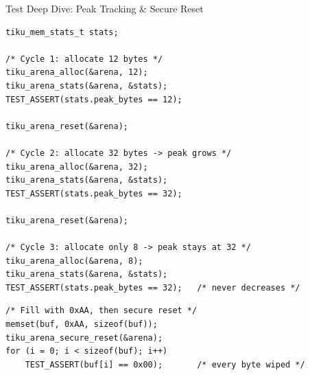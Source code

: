 \documentclass[aspectratio=169, 10pt]{beamer}
\begin{document}
\begin{frame}[fragile]{Test Deep Dive: Peak Tracking \& Secure Reset}
\begin{lstlisting}[style=cstyle, title={test\_tiku\_mem.c --- Peak tracking across resets}]
tiku_mem_stats_t stats;

/* Cycle 1: allocate 12 bytes */
tiku_arena_alloc(&arena, 12);
tiku_arena_stats(&arena, &stats);
TEST_ASSERT(stats.peak_bytes == 12);

tiku_arena_reset(&arena);

/* Cycle 2: allocate 32 bytes -> peak grows */
tiku_arena_alloc(&arena, 32);
tiku_arena_stats(&arena, &stats);
TEST_ASSERT(stats.peak_bytes == 32);

tiku_arena_reset(&arena);

/* Cycle 3: allocate only 8 -> peak stays at 32 */
tiku_arena_alloc(&arena, 8);
tiku_arena_stats(&arena, &stats);
TEST_ASSERT(stats.peak_bytes == 32);   /* never decreases */
\end{lstlisting}

\begin{lstlisting}[style=cstyle, title={test\_tiku\_mem.c --- Secure reset}]
/* Fill with 0xAA, then secure reset */
memset(buf, 0xAA, sizeof(buf));
tiku_arena_secure_reset(&arena);
for (i = 0; i < sizeof(buf); i++)
    TEST_ASSERT(buf[i] == 0x00);       /* every byte wiped */
\end{lstlisting}
\end{frame}
\end{document}
